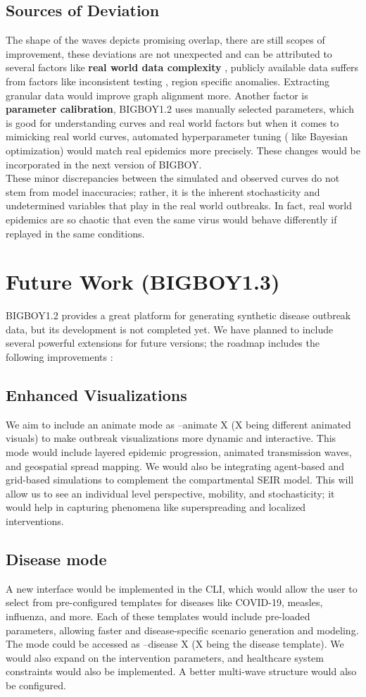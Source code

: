 \documentclass[11pt,a4paper]{article}
\theoremstyle{remark}\newtheorem{remark}{Remark}
\begin{document}
\subsection{Sources of Deviation}
The shape of the waves depicts promising overlap, there are still scopes of improvement, these deviations are not unexpected and can be attributed to several factors like \textbf{real world data complexity} , publicly available data suffers from factors like inconsistent testing , region specific anomalies. Extracting granular data would improve graph alignment more. Another factor is \textbf{parameter calibration}, BIGBOY1.2 uses manually selected parameters, which is good for understanding curves and real world factors but when it comes to mimicking real world curves, automated hyperparameter tuning ( like Bayesian optimization) would match real epidemics more precisely. These changes would be incorporated in the next version of BIGBOY.\\
These minor discrepancies between the simulated and observed curves do not stem from model inaccuracies; rather, it is the inherent stochasticity and undetermined variables that play in the real world outbreaks. In fact, real world epidemics are so chaotic that even the same virus would behave differently if replayed in the same conditions. 

\section{Future Work (BIGBOY1.3)}
BIGBOY1.2 provides a great platform for generating synthetic disease outbreak data, but its development is not completed yet. We have planned to include several powerful extensions for future versions; the roadmap includes the following improvements : 
\subsection{Enhanced Visualizations}
We aim to include an animate mode as --animate X (X being different animated visuals) to make outbreak visualizations more dynamic and interactive. This mode would include layered epidemic progression, animated transmission waves, and geospatial spread mapping. We would also be integrating agent-based and grid-based simulations to complement the compartmental SEIR model. This will allow us to see an individual level perspective, mobility, and stochasticity; it would help in capturing phenomena like superspreading and localized interventions.
\subsection{Disease mode}
A new interface would be implemented in the CLI, which would allow the user to select from pre-configured templates for diseases like COVID-19, measles, influenza, and more. Each of these templates would include pre-loaded parameters, allowing faster and disease-specific scenario generation and modeling. The mode could be accessed as --disease X (X being the disease template). We would also expand on the intervention parameters, and healthcare system constraints would also be implemented. A better multi-wave structure would also be configured.
\end{document}
